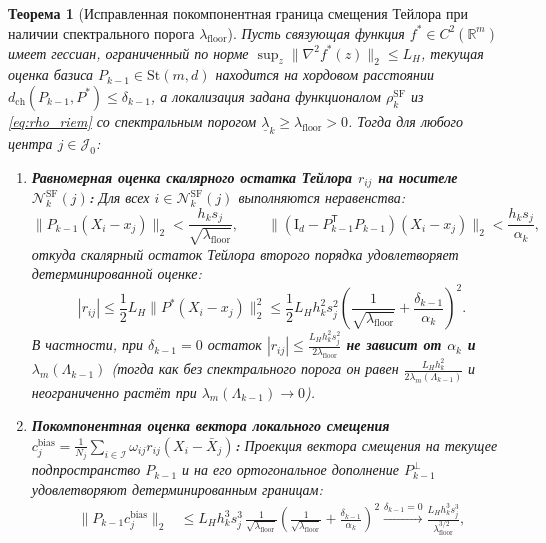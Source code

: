 \documentclass[11pt,a4paper]{article}
\newcommand{\R}{\mathbb{R}}
\newcommand{\Id}{\mathrm{I}}
\newcommand{\T}{^{\mathsf{T}}}
\newcommand{\St}{\mathrm{St}}
\newcommand{\PEDRs}{P^{*}}
\newcommand{\II}{\mathcal{I}}
\newcommand{\JJJ}{\mathcal{J}}
\newtheorem{theorem}{Теорема}[section]
\theoremstyle{definition}
\theoremstyle{remark}
\begin{document}
\begin{theorem}[Исправленная покомпонентная граница смещения Тейлора при наличии спектрального порога $\lambda_{\mathrm{floor}}$]\label{thm:riem_bias}
Пусть связующая функция $f^* \in C^2(\R^m)$ имеет гессиан, ограниченный по норме $\sup_{z}\|\nabla^2 f^*(z)\|_2 \le L_H$, текущая оценка базиса $P_{k-1} \in \St(m,d)$ находится на хордовом расстоянии $d_{\mathrm{ch}}(P_{k-1}, \PEDRs) \le \delta_{k-1}$, а локализация задана функционалом $\rho_k^{\mathrm{SF}}$ из \eqref{eq:rho_riem} со спектральным порогом $\underline{\lambda}_k \ge \lambda_{\mathrm{floor}} > 0$. Тогда для любого центра $j \in \JJJ_0$:
\begin{enumerate}
    \item \textbf{Равномерная оценка скалярного остатка Тейлора $r_{ij}$ на носителе $\mathcal{N}_k^{\mathrm{SF}}(j)$:} Для всех $i \in \mathcal{N}_k^{\mathrm{SF}}(j)$ выполняются неравенства:
    \begin{equation}\label{eq:proj_disp_bound}
        \|P_{k-1}(X_i - x_j)\|_2 < \frac{h_k s_j}{\sqrt{\lambda_{\mathrm{floor}}}}, \qquad \|(\Id_d - P_{k-1}\T P_{k-1})(X_i - x_j)\|_2 < \frac{h_k s_j}{\alpha_k},
    \end{equation}
    откуда скалярный остаток Тейлора второго порядка удовлетворяет детерминированной оценке:
    \begin{equation}\label{eq:scalar_rij_bound}
        |r_{ij}| \le \frac{1}{2} L_H \|\PEDRs(X_i - x_j)\|_2^2 \le \frac{1}{2} L_H h_k^2 s_j^2 \left(\frac{1}{\sqrt{\lambda_{\mathrm{floor}}}} + \frac{\delta_{k-1}}{\alpha_k}\right)^2.
    \end{equation}
    В частности, при $\delta_{k-1} = 0$ остаток $|r_{ij}| \le \frac{L_H h_k^2 s_j^2}{2 \lambda_{\mathrm{floor}}}$ \textbf{не зависит от $\alpha_k$ и $\lambda_m(\Lambda_{k-1})$} (тогда как без спектрального порога он равен $\frac{L_H h_k^2}{2\lambda_m(\Lambda_{k-1})}$ и неограниченно растёт при $\lambda_m(\Lambda_{k-1}) \to 0$).
    \item \textbf{Покомпонентная оценка вектора локального смещения $c_j^{\mathrm{bias}} = \frac{1}{N_j}\sum_{i \in \II} \omega_{ij} r_{ij}(X_i - \bar{X}_j)$:}
    Проекция вектора смещения на текущее подпространство $P_{k-1}$ и на его ортогональное дополнение $P_{k-1}^\perp$ удовлетворяют детерминированным границам:
    \begin{align}
        \bigl\|P_{k-1} c_j^{\mathrm{bias}}\bigr\|_2 &\le L_H h_k^3 s_j^3 \, \frac{1}{\sqrt{\lambda_{\mathrm{floor}}}}\left(\frac{1}{\sqrt{\lambda_{\mathrm{floor}}}} + \frac{\delta_{k-1}}{\alpha_k}\right)^2 \xrightarrow{\delta_{k-1} = 0} \frac{L_H h_k^3 s_j^3}{\lambda_{\mathrm{floor}}^{3/2}}, \label{eq:in_subspace_bias_bound}\\

\end{align}
\end{enumerate}
\end{theorem}
\end{document}
